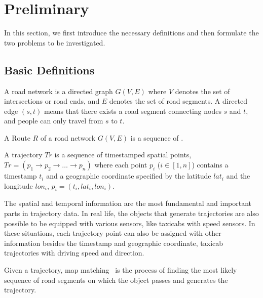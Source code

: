 \section{Preliminary}
\label{sec-preliminary}

In this section, we first introduce the necessary definitions %
and then formulate the two problems to be investigated.

\subsection{Basic Definitions}
\label{subsec-definition}

\begin{definition}A road network is a directed graph $G(V, E)$ where $V$ denotes the set of intersections or road ends, and $E$ denotes the set of road segments. A directed edge $(s, t)$ means that there exists a road segment connecting nodes $s$ and $t$, and people can only travel from $s$ to $t$.
\end{definition}


\begin{definition}[Route]A Route $R$ of a road network $G(V, E)$ is a sequence of .
\end{definition}


\begin{definition}[Trajectory]A trajectory $Tr$ is a sequence of timestamped spatial points, $Tr = (p_1 \rightarrow p_2 \rightarrow \dots \rightarrow p_n)$ where each point $p_i$ ($i\in[1,n]$) contains a timestamp $t_i$ and a geographic coordinate specified by the latitude $lat_i$ and the longitude $lon_i$, \ie $p_i=(t_i,lat_i,lon_i)$.
\end{definition}

The spatial and temporal information are the most fundamental and important parts in trajectory data. In real life, the objects that generate trajectories are also possible to be equipped with various sensors, like taxicabs with speed sensors. In these situations, each trajectory point can also be assigned with other information besides the timestamp and geographic coordinate, \eg taxicab trajectories with driving speed and direction.


\begin{definition}Given a trajectory, map matching~\cite{Newson2009MM,WuMSZZCWKDD16} is the process of finding the most likely sequence of road segments on which the object passes and generates the trajectory.
\end{definition}

